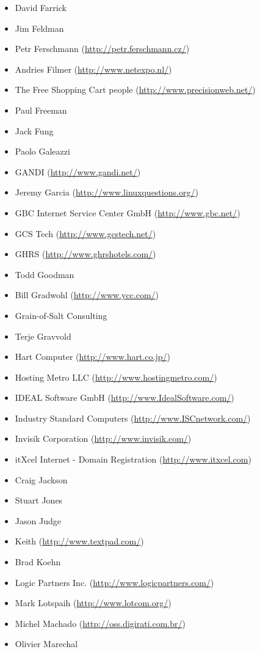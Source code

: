\documentclass[a4paper,titlepage,12pt]{article}
\begin{document}
\begin{itemize}
	\item David Farrick
	\item Jim Feldman
	\item Petr Ferschmann (\url{http://petr.ferschmann.cz/})
	\item Andries Filmer (\url{http://www.netexpo.nl/})
	\item The Free Shopping Cart people (\url{http://www.precisionweb.net/})
	\item Paul Freeman
	\item Jack Fung
	\item Paolo Galeazzi
	\item GANDI (\url{http://www.gandi.net/})
	\item Jeremy Garcia (\url{http://www.linuxquestions.org/})
	\item GBC Internet Service Center GmbH (\url{http://www.gbc.net/})
	\item GCS Tech (\url{http://www.gcstech.net/})
	\item GHRS (\url{http://www.ghrshotels.com/})
	\item Todd Goodman
	\item Bill Gradwohl (\url{http://www.ycc.com/})
	\item Grain-of-Salt Consulting
	\item Terje Gravvold
	\item Hart Computer (\url{http://www.hart.co.jp/})
	\item Hosting Metro LLC (\url{http://www.hostingmetro.com/})
	\item IDEAL Software GmbH (\url{http://www.IdealSoftware.com/})
	\item Industry Standard Computers (\url{http://www.ISCnetwork.com/})
	\item Invisik Corporation (\url{http://www.invisik.com/})
	\item itXcel Internet - Domain Registration (\url{http://www.itxcel.com})
	\item Craig Jackson
	\item Stuart Jones
	\item Jason Judge
	\item Keith (\url{http://www.textpad.com/})
	\item Brad Koehn
	\item Logic Partners Inc. (\url{http://www.logicpartners.com/})
	\item Mark Lotspaih (\url{http://www.lotcom.org/})
	\item Michel Machado (\url{http://oss.digirati.com.br/})
	\item Olivier Marechal

\end{itemize}
\end{document}
